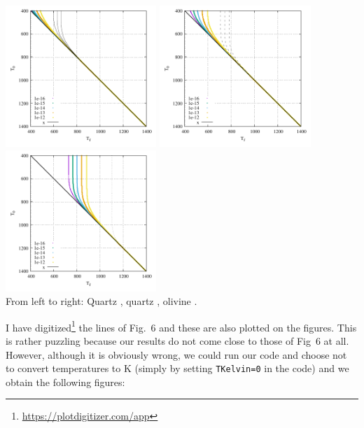\begin{center}
\includegraphics[width=5.7cm]{python_codes/fieldstone_167/1kelvin/fig6.pdf}
\includegraphics[width=5.7cm]{python_codes/fieldstone_167/2kelvin/fig6.pdf}
\includegraphics[width=5.7cm]{python_codes/fieldstone_167/3kelvin/fig6.pdf}\\
{\captionfont From left to right: Quartz \cite{brko80}, quartz \cite{stsa94}, olivine \cite{brko80}.}
\end{center}

I have digitized\footnote{\url{https://plotdigitizer.com/app}} the lines of Fig.~6
and these are also plotted on the figures.
This is rather puzzling because our results do not come close to those of Fig~6 at all. 
However, although it is obviously wrong, we could run our code and choose not 
to convert temperatures to \si{\kelvin} (simply by setting \lstinline|TKelvin=0| in the code) 
and we obtain the following figures:


